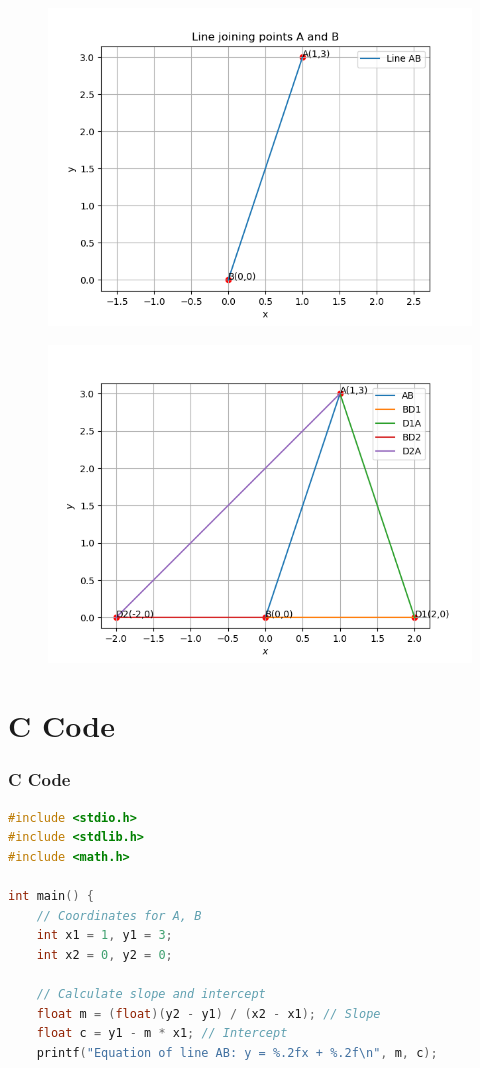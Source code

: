 \documentclass{beamer}
\theoremstyle{remark}
\numberwithin{equation}{section}
\begin{document}
       \begin{frame}[fragile]
    \begin{figure}[H]
    \centering
    \includegraphics[width = 0.6\columnwidth]{../figs1/img.png}
    \caption*{}
    \label{figs}
\end{figure}
\end{frame}
     \begin{frame}[fragile]
    \begin{figure}[H]
    \centering
    \includegraphics[width = 0.6\columnwidth]{../figs2/img.png}
    \caption*{}
    \label{figs}
\end{figure}
\end{frame}
\section{ C Code}
\begin{frame}[fragile]
\frametitle{C Code }
\begin{lstlisting}[language=C]
#include <stdio.h>
#include <stdlib.h>
#include <math.h>

int main() {
    // Coordinates for A, B
    int x1 = 1, y1 = 3;
    int x2 = 0, y2 = 0;

    // Calculate slope and intercept
    float m = (float)(y2 - y1) / (x2 - x1); // Slope
    float c = y1 - m * x1; // Intercept
    printf("Equation of line AB: y = %.2fx + %.2f\n", m, c);
\end{lstlisting}
\end{frame}
\end{document}
